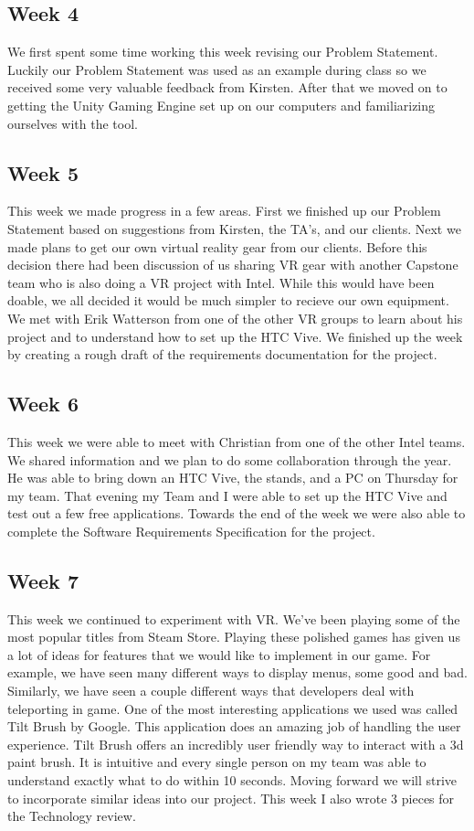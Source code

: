 \documentclass[10pt,journal,compsoc,onecolumn, draftclsnofoot]{IEEEtran}
\begin{document}
\subsection{Week 4}
We first spent some time working this week revising our Problem Statement.
Luckily our Problem Statement was used as an example during class so we received some very valuable feedback from Kirsten.
After that we moved on to getting the Unity Gaming Engine set up on our computers and familiarizing ourselves with the tool.

\subsection{Week 5}
This week we made progress in a few areas.
First we finished up our Problem Statement based on suggestions from Kirsten, the TA's, and our clients.
Next we made plans to get our own virtual reality gear from our clients.
Before this decision there had been discussion of us sharing VR gear with another Capstone team who is also doing a VR project with Intel.
While this would have been doable, we all decided it would be much simpler to recieve our own equipment.
We met with Erik Watterson from one of the other VR groups to learn about his project and to understand how to set up the HTC Vive.
We finished up the week by creating a rough draft of the requirements documentation for the project.

\subsection{Week 6}
This week we were able to meet with Christian from one of the other Intel teams.
We shared information and we plan to do some collaboration through the year.
He was able to bring down an HTC Vive, the stands, and a PC on Thursday for my team.
That evening my Team and I were able to set up the HTC Vive and test out a few free applications.
Towards the end of the week we were also able to complete the Software Requirements Specification for the project.

\subsection{Week 7}
This week we continued to experiment with VR. We've been playing some of the most popular titles from Steam Store.
Playing these polished games has given us a lot of ideas for features that we would like to implement in our game.
For example, we have seen many different ways to display menus, some good and bad.
Similarly, we have seen a couple different ways that developers deal with teleporting in game.
One of the most interesting applications we used was called Tilt Brush by Google.
This application does an amazing job of handling the user experience.
Tilt Brush offers an incredibly user friendly way to interact with a 3d paint brush.
It is intuitive and every single person on my team was able to understand exactly what to do within 10 seconds.
Moving forward we will strive to incorporate similar ideas into our project.
This week I also wrote 3 pieces for the Technology review.
\end{document}
